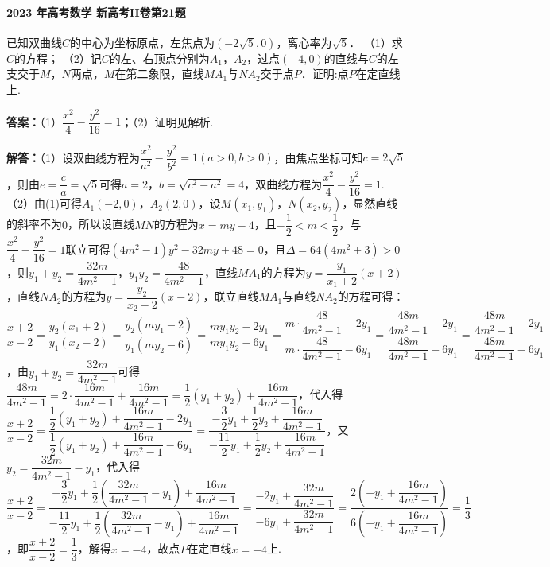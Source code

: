 \documentclass[UTF8,a4paper,11pt]{ctexart}
\begin{document}
\paragraph{2023 年高考数学 新高考II卷第21题}

已知双曲线$C$的中心为坐标原点，左焦点为$(-2\sqrt{5},0)$，离心率为$\sqrt{5}$．
（1）求$C$的方程；
（2）记$C$的左、右顶点分别为$A_{1}$，$A_{2}$，过点$(-4,0)$的直线与$C$的左支交于$M$，$N$两点，$M$在第二象限，直线$MA_{1}$与$NA_{2}$交于点$P$．证明:点$P$在定直线上.

\textbf{答案：}（1）$\dfrac{x^{2}}{4}-\dfrac{y^{2}}{16}=1$；（2）证明见解析.\par

\textbf{解答：}（1）设双曲线方程为$\dfrac{x^{2}}{a^{2}}-\dfrac{y^{2}}{b^{2}}=1(a>0,b>0)$，由焦点坐标可知$c=2\sqrt{5}$，则由$e=\dfrac{c}{a}=\sqrt{5}$可得$a=2$，$b=\sqrt{c^{2}-a^{2}}=4$，双曲线方程为$\dfrac{x^{2}}{4}-\dfrac{y^{2}}{16}=1$.
（2）由(1)可得$A_{1}(-2,0)$，$A_{2}(2,0)$，设$M(x_{1},y_{1})$，$N(x_{2},y_{2})$，显然直线的斜率不为$0$，所以设直线$MN$的方程为$x=my-4$，且$-\dfrac{1}{2}<m<\dfrac{1}{2}$，与$\dfrac{x^{2}}{4}-\dfrac{y^{2}}{16}=1$联立可得$(4m^{2}-1)y^{2}-32my+48=0$，且$\Delta=64(4m^{2}+3)>0$，则$y_{1}+y_{2}=\dfrac{32m}{4m^{2}-1}$，$y_{1}y_{2}=\dfrac{48}{4m^{2}-1}$，直线$MA_{1}$的方程为$y=\dfrac{y_{1}}{x_{1}+2}(x+2)$，直线$NA_{2}$的方程为$y=\dfrac{y_{2}}{x_{2}-2}(x-2)$，联立直线$MA_{1}$与直线$NA_{2}$的方程可得：$\dfrac{x+2}{x-2}=\dfrac{y_{2}(x_{1}+2)}{y_{1}(x_{2}-2)}=\dfrac{y_{2}(my_{1}-2)}{y_{1}(my_{2}-6)}=\dfrac{my_{1}y_{2}-2y_{1}}{my_{1}y_{2}-6y_{1}}=\dfrac{m\cdot\dfrac{48}{4m^{2}-1}-2y_{1}}{m\cdot\dfrac{48}{4m^{2}-1}-6y_{1}}=\dfrac{\dfrac{48m}{4m^{2}-1}-2y_{1}}{\dfrac{48m}{4m^{2}-1}-6y_{1}}=\dfrac{\dfrac{48m}{4m^{2}-1}-2y_{1}}{\dfrac{48m}{4m^{2}-1}-6y_{1}}$，由$y_{1}+y_{2}=\dfrac{32m}{4m^{2}-1}$可得$\dfrac{48m}{4m^{2}-1}=2\cdot\dfrac{16m}{4m^{2}-1}+\dfrac{16m}{4m^{2}-1}=\dfrac{1}{2}(y_{1}+y_{2})+\dfrac{16m}{4m^{2}-1}$，代入得$\dfrac{x+2}{x-2}=\dfrac{\dfrac{1}{2}(y_{1}+y_{2})+\dfrac{16m}{4m^{2}-1}-2y_{1}}{\dfrac{1}{2}(y_{1}+y_{2})+\dfrac{16m}{4m^{2}-1}-6y_{1}}=\dfrac{-\dfrac{3}{2}y_{1}+\dfrac{1}{2}y_{2}+\dfrac{16m}{4m^{2}-1}}{-\dfrac{11}{2}y_{1}+\dfrac{1}{2}y_{2}+\dfrac{16m}{4m^{2}-1}}$，又$y_{2}=\dfrac{32m}{4m^{2}-1}-y_{1}$，代入得$\dfrac{x+2}{x-2}=\dfrac{-\dfrac{3}{2}y_{1}+\dfrac{1}{2}(\dfrac{32m}{4m^{2}-1}-y_{1})+\dfrac{16m}{4m^{2}-1}}{-\dfrac{11}{2}y_{1}+\dfrac{1}{2}(\dfrac{32m}{4m^{2}-1}-y_{1})+\dfrac{16m}{4m^{2}-1}}=\dfrac{-2y_{1}+\dfrac{32m}{4m^{2}-1}}{-6y_{1}+\dfrac{32m}{4m^{2}-1}}=\dfrac{2(-y_{1}+\dfrac{16m}{4m^{2}-1})}{6(-y_{1}+\dfrac{16m}{4m^{2}-1})}=\dfrac{1}{3}$，即$\dfrac{x+2}{x-2}=\dfrac{1}{3}$，解得$x=-4$，故点$P$在定直线$x=-4$上.
\end{document}
